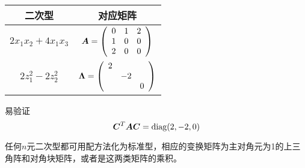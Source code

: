 \begin{frame}
  
    \begin{table}
      \caption{}
      \begin{tabular}{|c|c|}\hline
        二次型&对应矩阵\\\hline
        $2x_1x_2+4x_1x_3$ & $\boldsymbol{A}=\left(
        \begin{array}{ccc}
          0&1&2\\
          1&0&0\\
          2&0&0
        \end{array}
        \right)$\\\hline
        $2z_1^2-2z_2^2$ & $\boldsymbol{\Lambda}=\left(
        \begin{array}{ccc}
          2&&\\
          &-2&\\
          &&0
        \end{array}
        \right)$ \\\hline
      \end{tabular}      
    \end{table}
    易验证
    $$
    \boldsymbol{C}^T\boldsymbol{A}\boldsymbol{C}=\mathrm{diag}(2,-2,0)    
    $$
  
\end{frame}

\begin{frame}
  
    任何$n$元二次型都可用配方法化为标准型，相应的变换矩阵为主对角元为1的上三角阵和对角块矩阵，或者是这两类矩阵的乘积。
  
\end{frame}

